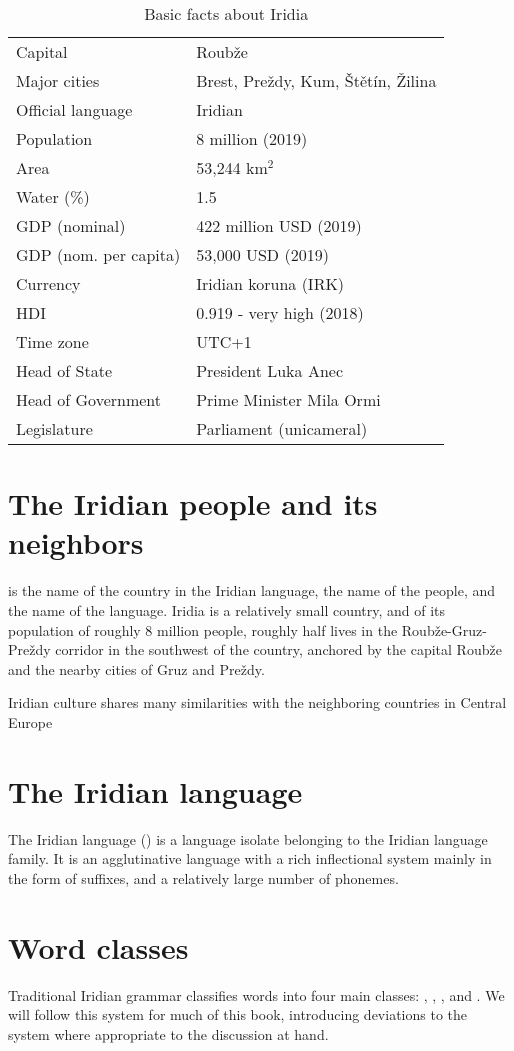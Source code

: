 \begin{table}
\centering \begin{tabular}{ll} \hline
Capital & Roubže \\
Major cities & Brest, Preždy, Kum, Štětín, Žilina \\
Official language & Iridian \\
Population & 8 million (2019) \\
Area & 53,244 km$^2$ \\
Water (\%) & 1.5 \\
GDP (nominal) & 422 million USD (2019) \\
GDP (nom. per capita) & 53,000 USD (2019) \\
Currency & Iridian koruna (IRK) \\
HDI & 0.919 - very high (2018) \\
Time zone & UTC+1 \\
Head of State & President Luka Anec \\
Head of Government & Prime Minister Mila Ormi \\
Legislature & Parliament (unicameral)\\
\hline
\end{tabular}
\caption{Basic facts about Iridia}
\label{tab:fact-sheet}
\end{table}


\section{The Iridian people and its neighbors}

 is the name of the country in the Iridian language,  the
name of the people, and  the name of the language. Iridia is
a relatively small country, and of its population of roughly 8 million people,
roughly half lives in the Roubže-Gruz-Preždy corridor in the southwest of the
country, anchored by the capital Roubže and the nearby cities of Gruz and
Preždy. 

Iridian culture shares many similarities with the neighboring countries in
Central Europe


\section{The Iridian language}

The Iridian language () is a language isolate belonging to
the Iridian language family. It is an agglutinative language with a rich
inflectional system mainly in the form of suffixes, and a relatively large
number of phonemes. 


\section{Word classes}\label{sec:wordclasses} Traditional Iridian grammar
classifies words into four main classes: ,
, , and
. We will follow this system for much of this book,
introducing deviations to the system where appropriate to the discussion at
hand.

